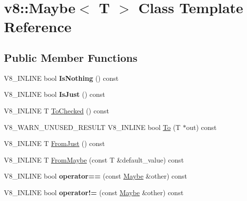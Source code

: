 \hypertarget{classv8_1_1Maybe}{}\section{v8\+:\+:Maybe$<$ T $>$ Class Template Reference}
\label{classv8_1_1Maybe}
\subsection*{Public Member Functions}
\begin{DoxyCompactItemize}
\item 
\mbox{\label{classv8_1_1Maybe_ae78f3cea1ba1913f81ca4f4751eb4f32}} 
V8\+\_\+\+I\+N\+L\+I\+NE bool {\bfseries Is\+Nothing} () const
\item 
\mbox{\label{classv8_1_1Maybe_a9f9150acc7eefe3dcb20b073bacd740f}} 
V8\+\_\+\+I\+N\+L\+I\+NE bool {\bfseries Is\+Just} () const
\item 
V8\+\_\+\+I\+N\+L\+I\+NE T \mbox{\hyperlink{classv8_1_1Maybe_abf2c0453c947f8c03f8e24b94887d33b}{To\+Checked}} () const
\item 
V8\+\_\+\+W\+A\+R\+N\+\_\+\+U\+N\+U\+S\+E\+D\+\_\+\+R\+E\+S\+U\+LT V8\+\_\+\+I\+N\+L\+I\+NE bool \mbox{\hyperlink{classv8_1_1Maybe_a7d1d77e5fd55f125fb4c41db1335bd09}{To}} (T $\ast$out) const
\item 
V8\+\_\+\+I\+N\+L\+I\+NE T \mbox{\hyperlink{classv8_1_1Maybe_a6c35f4870a5b5049d09ba5f13c67ede9}{From\+Just}} () const
\item 
V8\+\_\+\+I\+N\+L\+I\+NE T \mbox{\hyperlink{classv8_1_1Maybe_a4b95361b73d9af3dddd975accca89a5f}{From\+Maybe}} (const T \&default\+\_\+value) const
\item 
\mbox{\label{classv8_1_1Maybe_aca04e8431f10cf8d335ee7aa4e64d9ac}} 
V8\+\_\+\+I\+N\+L\+I\+NE bool {\bfseries operator==} (const \mbox{\hyperlink{classv8_1_1Maybe}{Maybe}} \&other) const
\item 
\mbox{\label{classv8_1_1Maybe_a3114cd0871d89142c15e0a3cd2d3c592}} 
V8\+\_\+\+I\+N\+L\+I\+NE bool {\bfseries operator!=} (const \mbox{\hyperlink{classv8_1_1Maybe}{Maybe}} \&other) const
\end{DoxyCompactItemize}
